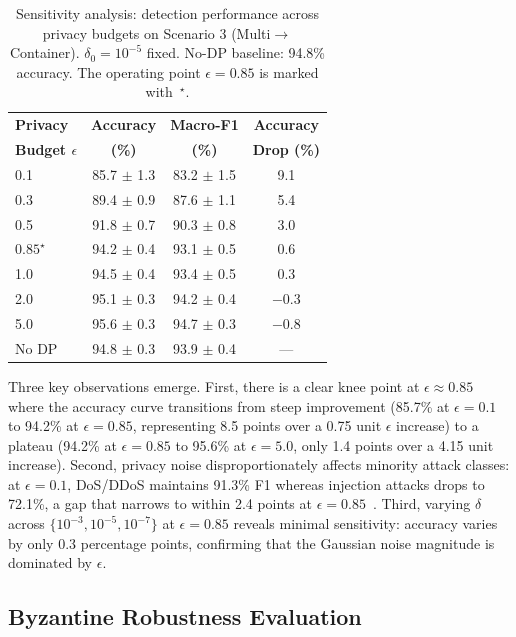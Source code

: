 \documentclass{ieeeaccess}
\theoremstyle{plain}
\theoremstyle{definition}
\theoremstyle{remark}
\begin{document}
\begin{table}[!t]
\renewcommand{\arraystretch}{1.3}
\caption{Sensitivity analysis: detection performance across privacy budgets on Scenario 3 (Multi$\to$Container). $\delta_0 = 10^{-5}$ fixed. No-DP baseline: 94.8\% accuracy. The operating point $\epsilon = 0.85$ is marked with~$^\star$.}
\label{tab:sensitivity}
\centering
\begin{tabular}{lccc}
\hline
\textbf{Privacy} & \textbf{Accuracy} & \textbf{Macro-F1} & \textbf{Accuracy}  \\
\textbf{Budget $\epsilon$} & \textbf{(\%)} & \textbf{(\%)} & \textbf{Drop (\%)} \\
\hline
0.1 & 85.7 $\pm$ 1.3 & 83.2 $\pm$ 1.5 & 9.1 \\
0.3 & 89.4 $\pm$ 0.9 & 87.6 $\pm$ 1.1 & 5.4 \\
0.5 & 91.8 $\pm$ 0.7 & 90.3 $\pm$ 0.8 & 3.0 \\
$0.85^\star$ & 94.2 $\pm$ 0.4 & 93.1 $\pm$ 0.5 & 0.6 \\
1.0 & 94.5 $\pm$ 0.4 & 93.4 $\pm$ 0.5 & 0.3 \\
2.0 & 95.1 $\pm$ 0.3 & 94.2 $\pm$ 0.4 & $-$0.3 \\
5.0 & 95.6 $\pm$ 0.3 & 94.7 $\pm$ 0.3 & $-$0.8 \\
\hline
No DP & 94.8 $\pm$ 0.3 & 93.9 $\pm$ 0.4 & --- \\
\hline
\end{tabular}
\end{table}

Three key observations emerge. First, there is a clear knee point at $\epsilon \approx 0.85$ where the accuracy curve transitions from steep improvement (85.7\% at $\epsilon = 0.1$ to 94.2\% at $\epsilon = 0.85$, representing 8.5 points over a 0.75 unit $\epsilon$ increase) to a plateau (94.2\% at $\epsilon = 0.85$ to 95.6\% at $\epsilon = 5.0$, only 1.4 points over a 4.15 unit increase). Second, privacy noise disproportionately affects minority attack classes: at $\epsilon = 0.1$, DoS/DDoS maintains 91.3\% F1 whereas injection attacks drops to 72.1\%, a gap that narrows to within 2.4 points at $\epsilon = 0.85$~\cite{dpfairness2025}. Third, varying $\delta$ across $\{10^{-3}, 10^{-5}, 10^{-7}\}$ at $\epsilon = 0.85$ reveals minimal sensitivity: accuracy varies by only 0.3 percentage points, confirming that the Gaussian noise magnitude is dominated by $\epsilon$.

\subsection{Byzantine Robustness Evaluation}
\label{sec:byzantine_results}
\end{document}

